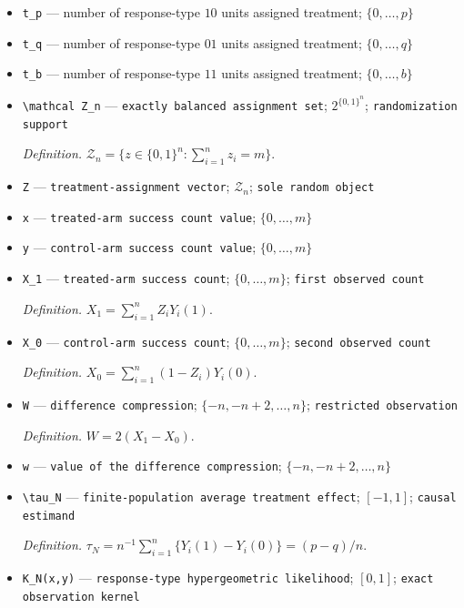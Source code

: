 \documentclass{article}
\begin{document}
\begin{itemize}
  \item \texttt{t\_\allowbreak{}p} --- number of response-type \(10\) units assigned treatment; \(\{0,\ldots,p\}\)
  \item \texttt{t\_\allowbreak{}q} --- number of response-type \(01\) units assigned treatment; \(\{0,\ldots,q\}\)
  \item \texttt{t\_\allowbreak{}b} --- number of response-type \(11\) units assigned treatment; \(\{0,\ldots,b\}\)
  \item \texttt{\textbackslash{}\allowbreak{}mathcal Z\_\allowbreak{}n} --- \texttt{exactly balanced assignment set}; \(2^{\{0,1\}^n}\); \texttt{randomization support}
  \par\smallskip\noindent\emph{Definition.} \(\mathcal Z_n=\{z\in\{0,1\}^n:\sum_{i=1}^n z_i=m\}\).
  \item \texttt{Z} --- \texttt{treatment-\allowbreak{}assignment vector}; \(\mathcal Z_n\); \texttt{sole random object}
  \item \texttt{x} --- \texttt{treated-\allowbreak{}arm success count value}; \(\{0,\ldots,m\}\)
  \item \texttt{y} --- \texttt{control-\allowbreak{}arm success count value}; \(\{0,\ldots,m\}\)
  \item \texttt{X\_\allowbreak{}1} --- \texttt{treated-\allowbreak{}arm success count}; \(\{0,\ldots,m\}\); \texttt{first observed count}
  \par\smallskip\noindent\emph{Definition.} \(X_1=\sum_{i=1}^n Z_iY_i(1)\).
  \item \texttt{X\_\allowbreak{}0} --- \texttt{control-\allowbreak{}arm success count}; \(\{0,\ldots,m\}\); \texttt{second observed count}
  \par\smallskip\noindent\emph{Definition.} \(X_0=\sum_{i=1}^n(1-Z_i)Y_i(0)\).
  \item \texttt{W} --- \texttt{difference compression}; \(\{-n,-n+2,\ldots,n\}\); \texttt{restricted observation}
  \par\smallskip\noindent\emph{Definition.} \(W=2(X_1-X_0)\).
  \item \texttt{w} --- \texttt{value of the difference compression}; \(\{-n,-n+2,\ldots,n\}\)
  \item \texttt{\textbackslash{}\allowbreak{}tau\_\allowbreak{}N} --- \texttt{finite-\allowbreak{}population average treatment effect}; \([-1,1]\); \texttt{causal estimand}
  \par\smallskip\noindent\emph{Definition.} \(\tau_N=n^{-1}\sum_{i=1}^n\{Y_i(1)-Y_i(0)\}=(p-q)/n\).
  \item \texttt{K\_\allowbreak{}N(x,\allowbreak{}y)} --- \texttt{response-\allowbreak{}type hypergeometric likelihood}; \([0,1]\); \texttt{exact observation kernel}

\end{itemize}
\end{document}
